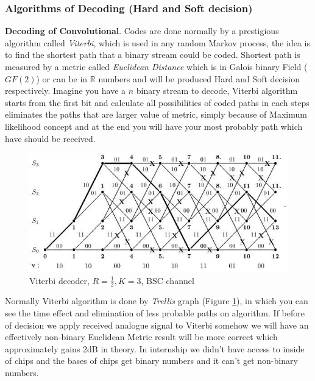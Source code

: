 



\subsubsection{Algorithms of Decoding  (Hard and Soft decision)}
\textbf{Decoding of Convolutional}. Codes are done normally by a prestigious algorithm called \textit{Viterbi}, which is used in any random Markov process, the idea is to find the shortest path that a binary stream could be coded. Shortest path is measured by a metric called \textit{Euclidean Distance} which is in Galois binary Field ($GF(2)$) or can be in $\mathbb{R}$ numbers and will be produced Hard and Soft decision respectively. Imagine you have a $n$ binary stream to decode, Viterbi algorithm starts from the first bit and calculate all possibilities of coded paths in each steps eliminates the paths that are larger value of metric, simply because of Maximum likelihood concept and at the end you will have your most probably path which have should be received.

\begin{figure}[htbp]
\centering
\includegraphics[scale=0.6]{Figures/viterbi.jpg}
\caption[Viterbi decoder, $R = \frac{1}{2}, K = 3$, BSC channel]{Viterbi decoder, $R = \frac{1}{2}, K = 3$, BSC channel}
\label{viterbi}
\end{figure}

Normally Viterbi algorithm is done by \textit{Trellis} graph (Figure \ref{viterbi}), in which you can see the time effect and elimination of less probable paths on algorithm. If before of decision we apply received analogue signal to Viterbi somehow we will have an effectively non-binary Euclidean Metric result will be more correct which approximately gains 2dB in theory. 
In internship we didn't have access to inside of chips and the bases of chips get binary numbers and it can't get non-binary numbers. 

